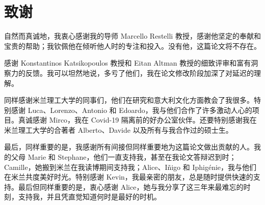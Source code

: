 \chapter*{致谢}

自然而真诚地，我衷心感谢我的导师 Marcello Restelli 教授，感谢他坚定的奉献和宝贵的帮助；我钦佩他在倾听他人时的专注和投入。没有他，这篇论文将不存在。

感谢 Konstantinos Katsikopoulos 教授和 Eitan Altman 教授的细致评审和富有洞察力的反馈。我可以坦然地说，多亏了他们，我在论文修改阶段加深了对延迟的理解。

同样感谢米兰理工大学的同事们，他们在研究和意大利文化方面教会了我很多。特别感谢 Luca、Lorenzo、Antonio 和 Edoardo，我与他们合作了许多激动人心的项目。真诚感谢 Mirco，我在 Covid-19 隔离前的好办公室伙伴。还要特别感谢我在米兰理工大学的合著者 Alberto、Davide 以及所有与我合作过的硕士生。

最后，同样重要的是，我感谢所有间接但同样重要地为这篇论文做出贡献的人。我的父母 Marie 和 Stephane，他们一直支持我，甚至在我论文答辩迟到时；Camille，她搬到米兰在我读博期间支持我；Alice、I\~{n}igo 和 Iphig\'enie，我与他们在米兰共度美好时光。特别感谢 Kevin，我最亲密的朋友，总是随时提供快速的支持。最后但同样重要的是，衷心感谢 Alice，她与我分享了这三年来最难忘的时刻，支持我，并且凭直觉知道何时是最好的时机。
